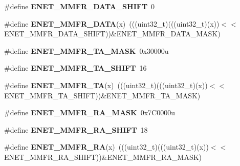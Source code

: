 \begin{DoxyCompactItemize}
\item 
\#define {\bfseries E\+N\+E\+T\+\_\+\+M\+M\+F\+R\+\_\+\+D\+A\+T\+A\+\_\+\+S\+H\+I\+FT}~0\hypertarget{group__ENET__Register__Masks_gaa6293f53a8dbb48f6ae13d9ea7717293}{}\label{group__ENET__Register__Masks_gaa6293f53a8dbb48f6ae13d9ea7717293}

\item 
\#define {\bfseries E\+N\+E\+T\+\_\+\+M\+M\+F\+R\+\_\+\+D\+A\+TA}(x)~(((uint32\+\_\+t)(((uint32\+\_\+t)(x))$<$$<$E\+N\+E\+T\+\_\+\+M\+M\+F\+R\+\_\+\+D\+A\+T\+A\+\_\+\+S\+H\+I\+FT))\&E\+N\+E\+T\+\_\+\+M\+M\+F\+R\+\_\+\+D\+A\+T\+A\+\_\+\+M\+A\+SK)\hypertarget{group__ENET__Register__Masks_gab9b153fc08d016ffe1c732b01889f1de}{}\label{group__ENET__Register__Masks_gab9b153fc08d016ffe1c732b01889f1de}

\item 
\#define {\bfseries E\+N\+E\+T\+\_\+\+M\+M\+F\+R\+\_\+\+T\+A\+\_\+\+M\+A\+SK}~0x30000u\hypertarget{group__ENET__Register__Masks_gac8464f2aec3816fb4088c18ff6a85f54}{}\label{group__ENET__Register__Masks_gac8464f2aec3816fb4088c18ff6a85f54}

\item 
\#define {\bfseries E\+N\+E\+T\+\_\+\+M\+M\+F\+R\+\_\+\+T\+A\+\_\+\+S\+H\+I\+FT}~16\hypertarget{group__ENET__Register__Masks_ga9559ded561df2769ecd05aed1233943a}{}\label{group__ENET__Register__Masks_ga9559ded561df2769ecd05aed1233943a}

\item 
\#define {\bfseries E\+N\+E\+T\+\_\+\+M\+M\+F\+R\+\_\+\+TA}(x)~(((uint32\+\_\+t)(((uint32\+\_\+t)(x))$<$$<$E\+N\+E\+T\+\_\+\+M\+M\+F\+R\+\_\+\+T\+A\+\_\+\+S\+H\+I\+FT))\&E\+N\+E\+T\+\_\+\+M\+M\+F\+R\+\_\+\+T\+A\+\_\+\+M\+A\+SK)\hypertarget{group__ENET__Register__Masks_gafa7ca4280c54ec8d167eff14acf8cac2}{}\label{group__ENET__Register__Masks_gafa7ca4280c54ec8d167eff14acf8cac2}

\item 
\#define {\bfseries E\+N\+E\+T\+\_\+\+M\+M\+F\+R\+\_\+\+R\+A\+\_\+\+M\+A\+SK}~0x7\+C0000u\hypertarget{group__ENET__Register__Masks_ga3325bdb05d05a8ec384202a6537a7f9f}{}\label{group__ENET__Register__Masks_ga3325bdb05d05a8ec384202a6537a7f9f}

\item 
\#define {\bfseries E\+N\+E\+T\+\_\+\+M\+M\+F\+R\+\_\+\+R\+A\+\_\+\+S\+H\+I\+FT}~18\hypertarget{group__ENET__Register__Masks_gacb92c97e6dc7b0e466141a7f7cb63f4d}{}\label{group__ENET__Register__Masks_gacb92c97e6dc7b0e466141a7f7cb63f4d}

\item 
\#define {\bfseries E\+N\+E\+T\+\_\+\+M\+M\+F\+R\+\_\+\+RA}(x)~(((uint32\+\_\+t)(((uint32\+\_\+t)(x))$<$$<$E\+N\+E\+T\+\_\+\+M\+M\+F\+R\+\_\+\+R\+A\+\_\+\+S\+H\+I\+FT))\&E\+N\+E\+T\+\_\+\+M\+M\+F\+R\+\_\+\+R\+A\+\_\+\+M\+A\+SK)\hypertarget{group__ENET__Register__Masks_ga8279a64d4827ed6f212bb99f7904bc13}{}\label{group__ENET__Register__Masks_ga8279a64d4827ed6f212bb99f7904bc13}


\end{DoxyCompactItemize}
